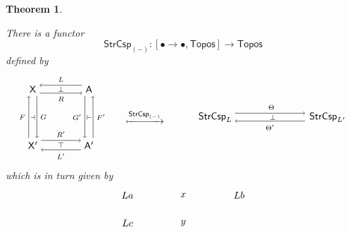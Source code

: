 \documentclass{amsart}
\newcommand{\A}{\cat{A}}
\newcommand{\X}{\cat{X}}
\newcommand{\Topos}{\cat{Topos}}
\newcommand{\StrCsp}{\cat{StrCsp}}
\newcommand{\cat}[1]{\mathsf{#1}}
\newcommand{\from}{\colon}
\newtheorem{theorem}{Theorem}[section]
\theoremstyle{remark}
\theoremstyle{definition}
\begin{document}
\begin{theorem} \label{thm:strcsp-isfunctorial}

  There is a functor
  \[
    \StrCsp_{(-)} \from
    [ \bullet \to \bullet , \Topos ]
    \to
    \Topos
  \]
  defined by  
  \[
    \begin{tikzpicture}
      \begin{scope}
      \node (1) at (-1,1) {\( \X \)};
      \node (2) at (-1,-1) {\( \X' \)};
      \node (3) at (1,1) {\( \A \)};
      \node (4) at (1,-1) {\( \A' \)};
      \draw [->] (1.-60) to node [right] {\scriptsize{\( G \)}} (2.60);
      \draw [<-] (1.-120) to node [left] {\scriptsize{\( F \)}} (2.120);
      \draw [<-] (1.30) to node [above] {\scriptsize{\( L \)}} (3.150);  
      \draw [->] (1.-30) to node [below] {\scriptsize{\( R \)}} (3.-150);
      \draw [->] (2.30) to node [above] {\scriptsize{\( R' \)}} (4.150);
      \draw [<-] (2.-30) to node [below] {\scriptsize{\( L' \)}} (4.-150);      
      \draw [<-] (3.-60) to node [right] {\scriptsize{\( F' \)}} (4.60);
      \draw [->] (3.-120) to node [left] {\scriptsize{\( G' \)}}
      (4.120);
      \node (5) at (0,-1) {\scriptsize{\( \top \)}};
      \node (6) at (0,1) {\scriptsize{\( \perp \)}};
      \node (7) at (-1,0) {\scriptsize{\( \dashv \)}};
      \node (8) at (1,0) {\scriptsize{\( \vdash \)}};
      \end{scope}
      \begin{scope}[shift={(3,0)}]
      \node (1) at (0,0) { $\xmapsto{ \StrCsp_{(-)} }$ };
      \end{scope}
      \begin{scope}[shift={(5.5,0)}]
      \node (1) [inner sep=0.1cm] at (0,0) {\( \StrCsp_{L} \)};
      \node (2) [inner sep=0.15cm] at (4,0) {\( \StrCsp_{L'} \)};
      \node (3) at (2,0) {\scriptsize{ \( \perp \) }};
      \draw [->]
        ([yshift= 4pt]1.east) to
        node [above] {\scriptsize{ \( \Theta \) }}
        ([yshift= 4pt]2.west);
      \draw [->]
        ([yshift= -4pt]2.west) to
        node [below] {\scriptsize{ \( \Theta' \) } }
        ([yshift= -4pt]1.east);  
      \end{scope}
    \end{tikzpicture}
  \]
  which is in turn given by
  \[
    \begin{tikzpicture}
      \begin{scope}
      \node (1) at (-2,1) {\( La \)};
      \node (2) at (0,1) {\( x \)};
      \node (3) at (2,1) {\( Lb \)};
      \node (4) at (-2,0) {\( Lc \)};
      \node (5) at (0,0) {\( y \)};

\end{scope}
\end{tikzpicture}\]
\end{theorem}
\end{document}
